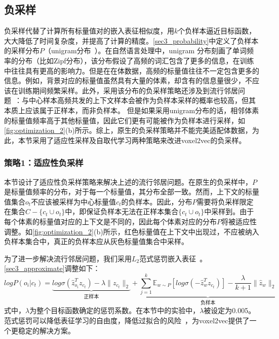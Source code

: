 \subsection{负采样}

负采样代替了计算所有标量值对的嵌入表征相似度，用$k$个负样本逼近目标函数，大大降低了时间复杂度，并提高了计算的精度。\autoref{sec3_probability}中定义了负样本的采样分布$P$（unigram分布~\cite{MIKOLOV:2013:DRO}）。在自然语言处理中，unigram 分布刻画了单词频率的分布（比如Zipf分布），该分布假设了高频的词汇包含了更多的信息，在训练中往往具有更高的影响力。但是在在体数据，高频的标量值往往不一定包含更多的信息。例如，背景对应的标量值虽然具有大量的体素，却含有的信息量很少，不应该在训练期间频繁采样。此外，采用该分布的负采样策略还涉及到流行邻居问题~\cite{ARMANDPOUR:2019:RNS}：与中心样本高频共发的上下文样本会被作为负样本采样的概率也较高，但其本质上应该属于正样本，而非负样本。
但是如果采用unigram分布的话，相邻体素的标量值频率高于其他标量值，因此它们更有可能被作为负样本进行采样，如\autoref{fig:optimization_2}(b)所示。综上，原生的负采样策略并不能完美适配体数据，为此，本节采用了适应性采样及自取代学习两种策略来改进voxel2vec的负采样。

\subsubsection{策略1：适应性负采样}

本节设计了适应性负采样策略来解决上述的流行邻居问题。在原生的负采样中，$P$是标量值频率的分布，对于每一个标量值，其分布全部一致。然而，上下文的标量值集合$o_t$不应该被采样为中心标量值$c_t$的负样本。因此，分布$P$需要将负采样限定在集合$C-\{c_t \cup o_t\}$中，即保证负样本无法在正样本集合$\{c_t \cup o_t\}$中采样到。由于每个体素的标量值对应的上下文是不同的，因此每个体素对应的分布$P$将被适应性调整。如\autoref{fig:optimization_2}(b)所示，红色标量值在上下文中出现过，不应被纳入负样本集合中，真正的负样本应从灰色标量值集合中采样。

为了进一步解决流行邻居问题，我们采用$L_2$范式惩罚嵌入表征~\cite{ARMANDPOUR:2019:RNS}。\autoref{sec3_approximate}调整如下：
\begin{equation}\label{sec3_loss}
    log P(o_i|c_t) = \underbrace{log \sigma(\hat{z}_{o_i}^{T}z_{c_t}) - \lambda \parallel z_{c_t} \parallel_2}_{\text{正样本}}  +  \underbrace{\sum_{j=1}^{k}\mathbb{E}_{w \sim P}[log \sigma(-\hat{z}_{w}^{T}z_{c_t})] - \frac{\lambda}{k+1} \parallel \hat{z}_{w} \parallel_2}_{\text{负样本}}
\end{equation}
式中，$\lambda$为整个目标函数确定的惩罚系数。在本节中的实验中，$\lambda$被设定为0.005。范式惩罚可以降低表征学习的自由度，降低过拟合的风险~\cite{FRIEDMAN:2001:TEO}，为voxel2vec提供了一个更稳定的解决方案。

